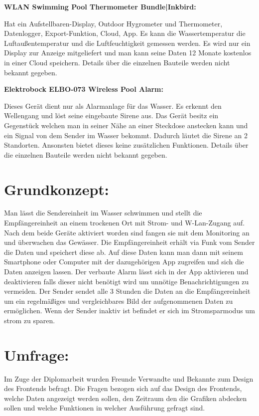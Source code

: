 \textbf{WLAN Swimming Pool Thermometer Bundle|Inkbird:}


Hat ein Aufstellbaren-Display, Outdoor Hygrometer und Thermometer, 
Datenlogger, Export-Funktion, Cloud, App. 
Es kann die Wassertemperatur die Luftaußentemperatur und die Luftfeuchtigkeit gemessen werden.
Es wird nur ein Display zur Anzeige mitgeliefert und man 
kann seine Daten 12 Monate kostenlos in einer Cloud speichern.
Details über die einzelnen Bauteile werden nicht bekannt gegeben.

\textbf{Elektrobock ELBO-073 Wireless Pool Alarm:}


Dieses Gerät dient nur als Alarmanlage für das Wasser. 
Es erkennt den Wellengang und löst seine eingebaute Sirene aus. 
Das Gerät besitz ein Gegenstück welchen man in seiner Nähe an einer Steckdose anstecken 
kann und ein Signal von dem Sender im Wasser bekommt. 
Dadurch läutet die Sirene an 2 Standorten. Ansonsten bietet dieses keine zusätzlichen Funktionen.
Details über die einzelnen Bauteile werden nicht bekannt gegeben.
\newpage
\section{Grundkonzept:}
Man lässt die Sendereinheit im Wasser schwimmen und stellt die Empfängereinheit an einem trockenen Ort mit Strom- und W-Lan-Zugang auf. 
Nach dem beide Geräte aktiviert worden sind fangen sie mit dem Monitoring an und überwachen das Gewässer. 
Die Empfängereinheit erhält via Funk vom Sender die Daten und speichert diese ab. Auf diese Daten kann man dann mit seinem Smartphone oder Computer mit der dazugehörigen App zugreifen und sich die Daten anzeigen lassen. 
Der verbaute Alarm lässt sich in der App aktivieren und deaktivieren falls dieser nicht benötigt wird um 
unnötige Benachrichtigungen zu vermeiden.
Der Sender sendet alle 3 Stunden die Daten an die Empfängereinheit um ein regelmäßiges und vergleichbares Bild der aufgenommenen Daten zu ermöglichen.
Wenn der Sender inaktiv ist befindet er sich im Stromsparmodus um strom zu sparen.
\section{Umfrage:}
Im Zuge der Diplomarbeit wurden Freunde Verwandte und Bekannte zum Design des Frontends 
befragt. Die Fragen bezogen sich auf das Design des Frontends, welche Daten angezeigt werden sollen,
den Zeitraum den die Grafiken abdecken sollen und welche Funktionen in welcher Ausführung gefragt sind.

